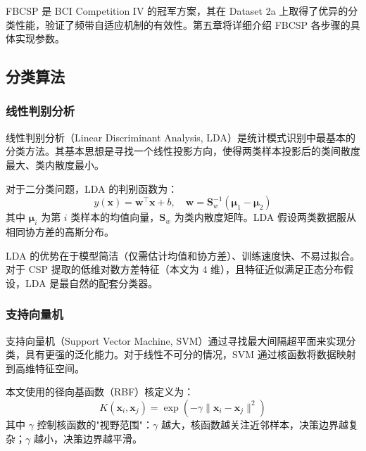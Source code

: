 FBCSP 是 BCI Competition IV 的冠军方案，其在 Dataset 2a 上取得了优异的分类性能，验证了频带自适应机制的有效性。第五章将详细介绍 FBCSP 各步骤的具体实现参数。

\subsection{分类算法}
\label{sec:classifiers-theory}

\subsubsection{线性判别分析}

线性判别分析（Linear Discriminant Analysis, LDA）是统计模式识别中最基本的分类方法。其基本思想是寻找一个线性投影方向，使得两类样本投影后的类间散度最大、类内散度最小。

对于二分类问题，LDA 的判别函数为：
\begin{equation}\label{eq:lda}
y(\mathbf{x}) = \mathbf{w}^\top \mathbf{x} + b, \quad \mathbf{w} = \mathbf{S}_w^{-1} (\boldsymbol{\mu}_1 - \boldsymbol{\mu}_2)
\end{equation}
其中 $\boldsymbol{\mu}_i$ 为第 $i$ 类样本的均值向量，$\mathbf{S}_w$ 为类内散度矩阵。LDA 假设两类数据服从相同协方差的高斯分布。

LDA 的优势在于模型简洁（仅需估计均值和协方差）、训练速度快、不易过拟合。对于 CSP 提取的低维对数方差特征（本文为 4 维），且特征近似满足正态分布假设，LDA 是最自然的配套分类器。

\subsubsection{支持向量机}

支持向量机（Support Vector Machine, SVM）通过寻找最大间隔超平面来实现分类，具有更强的泛化能力。对于线性不可分的情况，SVM 通过核函数将数据映射到高维特征空间。

本文使用的径向基函数（RBF）核定义为：
\begin{equation}\label{eq:rbf}
K(\mathbf{x}_i, \mathbf{x}_j) = \exp\left(-\gamma \|\mathbf{x}_i - \mathbf{x}_j\|^2\right)
\end{equation}
其中 $\gamma$ 控制核函数的"视野范围"：$\gamma$ 越大，核函数越关注近邻样本，决策边界越复杂；$\gamma$ 越小，决策边界越平滑。


